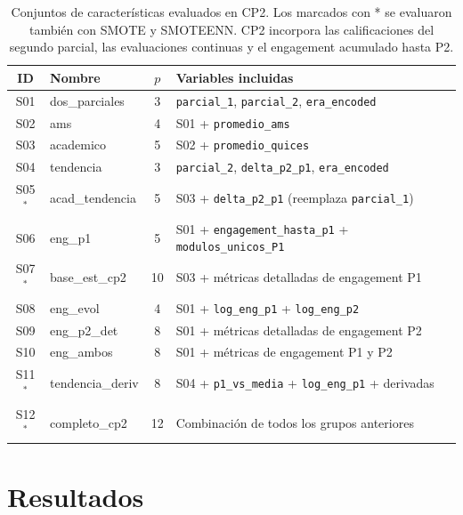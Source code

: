 \documentclass[12pt, letterpaper, openany]{report}
\begin{document}
\begin{table}[htbp]
  \centering
  \caption{Conjuntos de características evaluados en CP2. Los marcados con * se evaluaron también con SMOTE y SMOTEENN. CP2 incorpora las calificaciones del segundo parcial, las evaluaciones continuas y el engagement acumulado hasta P2.}
  \label{tab:feature_sets_cp2}
  \small
  \begin{tabular}{clcp{7cm}}
    \toprule
    ID & Nombre & $p$ & Variables incluidas \\
    \midrule
    S01 & dos\_parciales      &  3 & \texttt{parcial\_1}, \texttt{parcial\_2}, \texttt{era\_encoded} \\
    S02 & ams                 &  4 & S01 + \texttt{promedio\_ams} \\
    S03 & academico           &  5 & S02 + \texttt{promedio\_quices} \\
    S04 & tendencia           &  3 & \texttt{parcial\_2}, \texttt{delta\_p2\_p1}, \texttt{era\_encoded} \\
    S05$^*$ & acad\_tendencia &  5 & S03 + \texttt{delta\_p2\_p1} (reemplaza \texttt{parcial\_1}) \\
    S06 & eng\_p1             &  5 & S01 + \texttt{engagement\_hasta\_p1} + \texttt{modulos\_unicos\_P1} \\
    S07$^*$ & base\_est\_cp2  & 10 & S03 + métricas detalladas de engagement P1 \\
    S08 & eng\_evol           &  4 & S01 + \texttt{log\_eng\_p1} + \texttt{log\_eng\_p2} \\
    S09 & eng\_p2\_det        &  8 & S01 + métricas detalladas de engagement P2 \\
    S10 & eng\_ambos          &  8 & S01 + métricas de engagement P1 y P2 \\
    S11$^*$ & tendencia\_deriv &  8 & S04 + \texttt{p1\_vs\_media} + \texttt{log\_eng\_p1} + derivadas \\
    S12$^*$ & completo\_cp2   & 12 & Combinación de todos los grupos anteriores \\
    \bottomrule
  \end{tabular}
\end{table}

\chapter{Resultados}
\label{chap:resultados}
\end{document}
